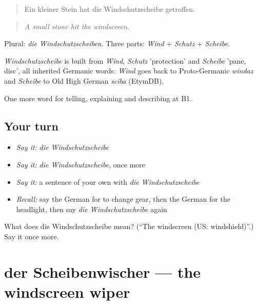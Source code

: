 \begin{quote}
Ein kleiner Stein hat die Windschutzscheibe getroffen.
\end{quote}

\begin{quote}
\emph{A small stone hit the windscreen.}
\end{quote}

Plural: \emph{die Windschutzscheiben}. Three parts: \emph{Wind} + \emph{Schutz} + \emph{Scheibe}.

\begin{cousinweb}
\emph{Windschutzscheibe} is built from \emph{Wind}, \emph{Schutz} 'protection' and \emph{Scheibe} 'pane, disc', all inherited Germanic words: \emph{Wind} goes back to Proto-Germanic \emph{windaz} and \emph{Scheibe} to Old High German \emph{scība} (EtymDB).
\end{cousinweb}

\begin{grammarlens}[title={What you've built}]
One more word for telling, explaining and describing at B1.
\end{grammarlens}

\subsection*{Your turn}
\begin{itemize}
\raggedright
  \item \emph{Say it:} \emph{die Windschutzscheibe}
  \item \emph{Say it:} \emph{die Windschutzscheibe}, once more
  \item \emph{Say it:} a sentence of your own with \emph{die Windschutzscheibe}
  \item \emph{Recall:} say the German for to change gear, then the German for the headlight, then say \emph{die Windschutzscheibe} again
\end{itemize}

\begin{tcolorbox}[breakable,colback=teal!4,colframe=teal!35!black,title={Before you move on}]
What does die Windschutzscheibe mean? (\textquotedblleft{}The windscreen (US: windshield)\textquotedblright{}.) Say it once more.
\end{tcolorbox}
\section[der Scheibenwischer]{der Scheibenwischer — the windscreen wiper}

